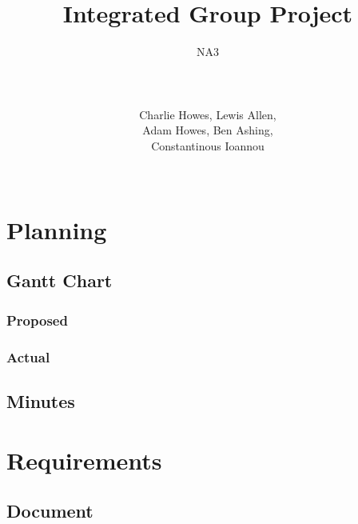 \documentclass[a4paper]{article}
\title{Integrated Group Project}
\author{NA3
	\\ \rule{5cm}{0.4pt}
	\\Charlie Howes, Lewis Allen, 
    \\Adam Howes, Ben Ashing, 
    \\Constantinous Ioannou
    \\ \rule{5cm}{0.4pt}
} %
\begin{document}
\maketitle

\tableofcontents

\pagebreak

\section{Planning}
\subsection{Gantt Chart}
\subsubsection{Proposed}
\subsubsection{Actual} %

\subsection{Minutes}

\pagebreak

\section{Requirements}

\subsection{Document} %
\end{document}
